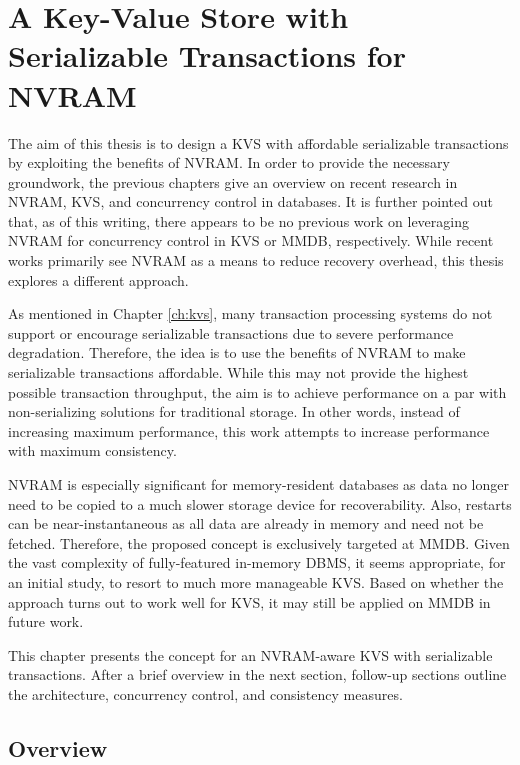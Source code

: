\chapter{A Key-Value Store with Serializable Transactions for NVRAM}
\label{ch:concept}

The aim of this thesis is to design a \ac{KVS} with affordable serializable
transactions by exploiting the benefits of \ac{NVRAM}. In order to provide the
necessary groundwork, the previous chapters give an overview on recent research
in \ac{NVRAM}, \ac{KVS}, and concurrency control in databases. It is further
pointed out that, as of this writing, there appears to be no previous work on
leveraging \ac{NVRAM} for concurrency control in \ac{KVS} or \ac{MMDB},
respectively. While recent works primarily see \ac{NVRAM} as a means to reduce
recovery overhead, this thesis explores a different approach.

As mentioned in Chapter \ref{ch:kvs}, many transaction processing systems do not
support or encourage serializable transactions due to severe performance
degradation. Therefore, the idea is to use the benefits of \ac{NVRAM} to make
serializable transactions affordable. While this may not provide the highest
possible transaction throughput, the aim is to achieve performance on a par with
non-serializing solutions for traditional storage. In other words, instead of
increasing maximum performance, this work attempts to increase performance with
maximum consistency.

\ac{NVRAM} is especially significant for memory-resident databases as data no
longer need to be copied to a much slower storage device for recoverability.
Also, restarts can be near-instantaneous as all data are already in memory and
need not be fetched. Therefore, the proposed concept is exclusively targeted at
\ac{MMDB}. Given the vast complexity of fully-featured in-memory \ac{DBMS}, it
seems appropriate, for an initial study, to resort to much more manageable
\ac{KVS}. Based on whether the approach turns out to work well for \ac{KVS}, it
may still be applied on \ac{MMDB} in future work.

This chapter presents the concept for an \ac{NVRAM}-aware \ac{KVS} with
serializable transactions. After a brief overview in the next section,
follow-up sections outline the architecture, concurrency control, and
consistency measures.

\section{Overview}
\label{ch:concept-overview}


